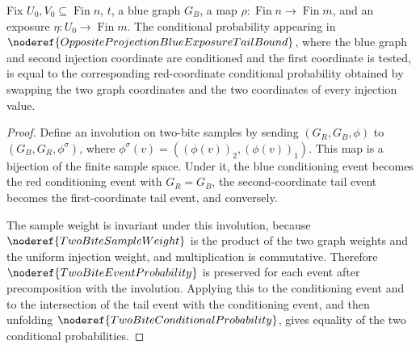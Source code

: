 \begin{helper}
Fix \(U_0,V_0\subseteq\operatorname{Fin}n\), \(t\), a blue graph \(G_B\), a
map \(\rho:\operatorname{Fin}n\to\operatorname{Fin}m\), and an exposure
\(\eta:U_0\to\operatorname{Fin}m\).  The conditional probability appearing in
\(\noderef{OppositeProjectionBlueExposureTailBound}\), where the blue graph
and second injection coordinate are conditioned and the first coordinate is
tested, is equal to the corresponding red-coordinate conditional probability
obtained by swapping the two graph coordinates and the two coordinates of
every injection value.
\end{helper}
\begin{proof}
Define an involution on two-bite samples by sending
\((G_R,G_B,\phi)\) to \((G_B,G_R,\phi^\sigma)\), where
\(\phi^\sigma(v)=((\phi(v))_2,(\phi(v))_1)\).  This map is a bijection of the
finite sample space.  Under it, the blue conditioning event becomes the red
conditioning event with \(G_R=G_B\), the second-coordinate tail event becomes
the first-coordinate tail event, and conversely.

The sample weight is invariant under this involution, because
\(\noderef{TwoBiteSampleWeight}\) is the product of the two graph weights and
the uniform injection weight, and multiplication is commutative.  Therefore
\(\noderef{TwoBiteEventProbability}\) is preserved for each event after
precomposition with the involution.  Applying this to the conditioning event
and to the intersection of the tail event with the conditioning event, and
then unfolding \(\noderef{TwoBiteConditionalProbability}\), gives equality of
the two conditional probabilities.
\end{proof}
